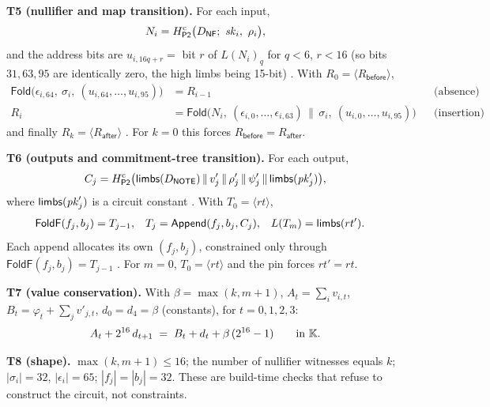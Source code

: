 \begin{definition}
\medskip\noindent\textbf{T5 (nullifier and map transition).} For each input,
\[
  N_i = \Hp^{\mathrm{c}}\big(D_{\mathsf{NF}};\ \mathit{sk}_i,\ \rho_i\big),
\]
and the address bits are $u_{i,16q+r} = $ bit $r$ of $L(N_i)_q$ for $q<6$,
$r<16$ (so bits $31,63,95$ are identically zero, the high limbs being 15-bit)
. With
$R_0=\langle R_{\mathsf{before}}\rangle$,
\begin{align}
  \mathsf{Fold}\big(\epsilon_{i,64},\ \sigma_i,\ (u_{i,64},\dots,u_{i,95})\big) &= R_{i-1}
  &&\text{(absence)}\\
  R_i &= \mathsf{Fold}\big(N_i,\ (\epsilon_{i,0},\dots,\epsilon_{i,63})\,\|\,\sigma_i,\ (u_{i,0},\dots,u_{i,95})\big)
  &&\text{(insertion)}
\end{align}
and finally $R_k=\langle R_{\mathsf{after}}\rangle$
. For $k=0$ this forces
$R_{\mathsf{before}}=R_{\mathsf{after}}$.

\medskip\noindent\textbf{T6 (outputs and commitment-tree transition).} For each output,
\[
  C_j = H_{\mathsf{P2}}^{\mathrm{c}}\big(\mathsf{limbs}(D_{\mathsf{NOTE}})\,\|\,v'_j\,\|\,\rho'_j\,\|\,\psi'_j\,\|\,\mathsf{limbs}(\mathit{pk}'_j)\big),
\]
where $\mathsf{limbs}(\mathit{pk}'_j)$ is a circuit constant
. With $T_0=\langle rt\rangle$,
\begin{align}
  \mathsf{FoldF}(f_j,b_j) &= T_{j-1}, &
  T_j &= \mathsf{Append}(f_j,b_j,C_j), &
  L(T_m) &= \mathsf{limbs}(rt') .
\end{align}
Each append allocates its own $(f_j,b_j)$, constrained only through
$\mathsf{FoldF}(f_j,b_j)=T_{j-1}$ . For $m=0$, $T_0=\langle rt\rangle$
and the pin forces $rt'=rt$.

\medskip\noindent\textbf{T7 (value conservation).} With
$\beta=\max(k,m+1)$, $A_t=\sum_{i}v_{i,t}$, $B_t=\varphi_t+\sum_{j}v'_{j,t}$,
$d_0=d_4=\beta$ (constants), for $t=0,1,2,3$:
\begin{equation}
  A_t + 2^{16}\,d_{t+1} \;=\; B_t + d_t + \beta\,(2^{16}-1)
  \qquad\text{in }\mathbb{K} .
\end{equation}

\medskip\noindent\textbf{T8 (shape).} $\max(k,m+1)\le 16$; the number of
nullifier witnesses equals $k$; $|\sigma_i|=32$, $|\epsilon_i|=65$; $|f_j|=|b_j|=32$.
These are build-time checks that refuse to construct the circuit, not
constraints. 
\end{definition}

